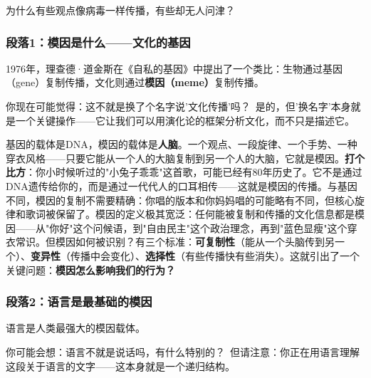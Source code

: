 \documentclass[../main.tex]{subfiles}
\begin{document}
	\begin{questionbox}

		为什么有些观点像病毒一样传播，有些却无人问津？

	\end{questionbox}

	\subsubsection*{段落1：模因是什么——文化的基因}

	1976年，理查德·道金斯在《自私的基因》中提出了一个类比：生物通过基因（gene）复制传播，文化则通过\textbf{模因（meme）}复制传播。

	\begin{tcolorbox}[colback=yellow!5, title=\textit{读者行为预测}]

		你现在可能觉得：这不就是换了个名字说'文化传播'吗？\ 是的，但'换名字'本身就是一个关键操作——它让我们可以用演化论的框架分析文化，而不只是描述它。

	\end{tcolorbox}

基因的载体是DNA，模因的载体是\textbf{人脑}。一个观点、一段旋律、一个手势、一种穿衣风格——只要它能从一个人的大脑复制到另一个人的大脑，它就是模因。\textbf{打个比方}：你小时候听过的"小兔子乖乖"这首歌，可能已经有80年历史了。它不是通过DNA遗传给你的，而是通过一代代人的口耳相传——这就是模因的传播。与基因不同，模因的复制不需要精确：你唱的版本和你妈妈唱的可能略有不同，但核心旋律和歌词被保留了。模因的定义极其宽泛：任何能被复制和传播的文化信息都是模因——从"你好"这个问候语，到"自由民主"这个政治理念，再到"蓝色显瘦"这个穿衣常识。但模因如何被识别？有三个标准：\textbf{可复制性}（能从一个头脑传到另一个）、\textbf{变异性}（传播中会变化）、\textbf{选择性}（有些传播快有些消失）。这就引出了一个关键问题：\textbf{模因怎么影响我们的行为？}

	\subsubsection*{段落2：语言是最基础的模因}

	语言是人类最强大的模因载体。

	\begin{tcolorbox}[colback=yellow!5, title=\textit{读者行为预测}]

		你可能会想：语言不就是说话吗，有什么特别的？\ 但请注意：你正在用语言理解这段关于语言的文字——这本身就是一个递归结构。

	\end{tcolorbox}
\end{document}
